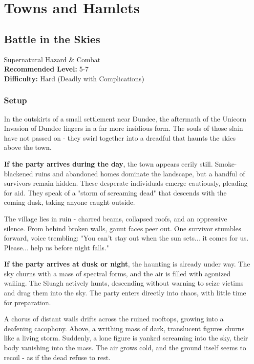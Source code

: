 \chapter*{Towns and Hamlets}

\section*{Battle in the Skies}
{\entryfont Supernatural Hazard \& Combat\\
\textbf{Recommended Level:} 5-7\\
\textbf{Difficulty:} Hard (Deadly with Complications)}

\subsection*{Setup}
{\entryfont In the outskirts of a small settlement near Dundee, the aftermath of the Unicorn Invasion of Dundee lingers in a far more insidious form. The souls of those slain have not passed on - they swirl together into a dreadful \hyperref[monster:Sluagh]{} that haunts the skies above the town.

\textbf{If the party arrives during the day}, the town appears eerily still. Smoke-blackened ruins and abandoned homes dominate the landscape, but a handful of survivors remain hidden. These desperate individuals emerge cautiously, pleading for aid. They speak of a "storm of screaming dead" that descends with the coming dusk, taking anyone caught outside.}
\begin{DndReadAloud}
	The village lies in ruin - charred beams, collapsed roofs, and an oppressive silence. From behind broken walls, gaunt faces peer out. One survivor stumbles forward, voice trembling: "You can't stay out when the sun sets... it comes for us. Please... help us before night falls."
\end{DndReadAloud}
{\noindent\entryfont \textbf{If the party arrives at dusk or night}, the haunting is already under way. The sky churns with a mass of spectral forms, and the air is filled with agonized wailing. The Sluagh actively hunts, descending without warning to seize victims and drag them into the sky. The party enters directly into chaos, with little time for preparation.}
\begin{DndReadAloud}
	A chorus of distant wails drifts across the ruined rooftops, growing into a deafening cacophony. Above, a writhing mass of dark, translucent figures churns like a living storm. Suddenly, a lone figure is yanked screaming into the sky, their body vanishing into the mass. The air grows cold, and the ground itself seems to recoil - as if the dead refuse to rest.
\end{DndReadAloud}

